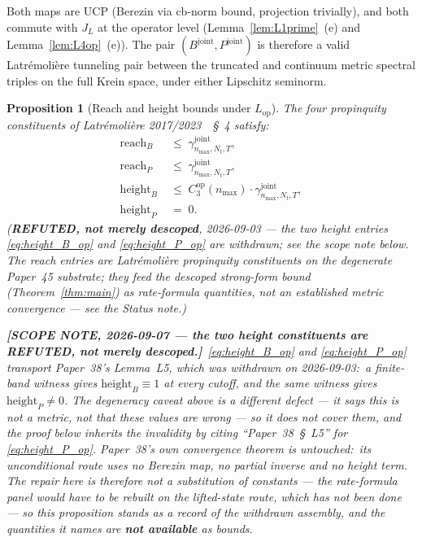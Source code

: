 \documentclass[11pt,a4paper]{article}
\theoremstyle{plain}
\newtheorem{proposition}[theorem]{Proposition}
\theoremstyle{definition}
\newcommand{\nmax}{n_{\max}}
\newcommand{\Nt}{N_{t}}
\newcommand{\JL}{J_{L}}
\newcommand{\Lop}{L_{\mathrm{op}}}
\newcommand{\Bjoint}{B^{\mathrm{joint}}}
\newcommand{\Pjoint}{P^{\mathrm{joint}}}
\newcommand{\gammajoint}{\gamma^{\mathrm{joint}}}
\newcommand{\Cthreeop}{C_{3}^{\mathrm{op}}}
\begin{document}
Both maps are UCP (Berezin via cb-norm bound, projection trivially),
and both commute with $\JL$ at the operator level
(Lemma~\ref{lem:L1prime}~(e) and Lemma~\ref{lem:L4op}~(e)). The pair
$(\Bjoint, \Pjoint)$ is therefore a valid Latr\'emoli\`ere tunneling
pair between the truncated and continuum metric spectral triples on
the full Krein space, under either Lipschitz seminorm.

\begin{proposition}[Reach and height bounds under $\Lop$]\label{prop:reach_height_op}
The four propinquity constituents of Latr\'emoli\`ere
2017/2023~\cite{latremoliere_metric_st_2017}~\S~4 satisfy:
\begin{align}
   \mathrm{reach}_{B} &\;\le\; \gammajoint_{\nmax, \Nt, T},
   \label{eq:reach_B_op} \\
   \mathrm{reach}_{P} &\;\le\; \gammajoint_{\nmax, \Nt, T},
   \label{eq:reach_P_op} \\
   \mathrm{height}_{B} &\;\le\; \Cthreeop(\nmax) \cdot \gammajoint_{\nmax, \Nt, T},
   \label{eq:height_B_op} \\
   \mathrm{height}_{P} &\;=\; 0.
   \label{eq:height_P_op}
\end{align}
\emph{(\textbf{REFUTED, not merely descoped}, 2026-09-03 --- the two height
entries \eqref{eq:height_B_op} and \eqref{eq:height_P_op} are withdrawn;
see the scope note below.  The reach entries are Latr\'emoli\`ere
propinquity constituents on the degenerate Paper~45 substrate; they feed
the descoped strong-form bound (Theorem~\ref{thm:main}) as rate-formula
quantities, not an established metric convergence --- see the Status
note.)}

\textbf{[SCOPE NOTE, 2026-09-07 --- the two height constituents are
REFUTED, not merely descoped.]}\ \eqref{eq:height_B_op} and
\eqref{eq:height_P_op} transport Paper~38's Lemma~L5, which was withdrawn on
2026-09-03:\ a finite-band witness gives $\mathrm{height}_{B} \equiv 1$ at
every cutoff, and the same witness gives $\mathrm{height}_{P} \neq 0$.  The
degeneracy caveat above is a \emph{different} defect --- it says this is not a
metric, not that these values are wrong --- so it does not cover them, and the
proof below inherits the invalidity by citing ``Paper~38~\S~L5'' for
\eqref{eq:height_P_op}.  Paper~38's own convergence theorem is untouched:\ its
unconditional route uses no Berezin map, no partial inverse and no height term.
The repair here is therefore \emph{not} a substitution of constants --- the
rate-formula panel would have to be rebuilt on the lifted-state route, which
has not been done --- so this proposition stands as a record of the withdrawn
assembly, and the quantities it names are \textbf{not available} as bounds.
\end{proposition}
\end{document}
